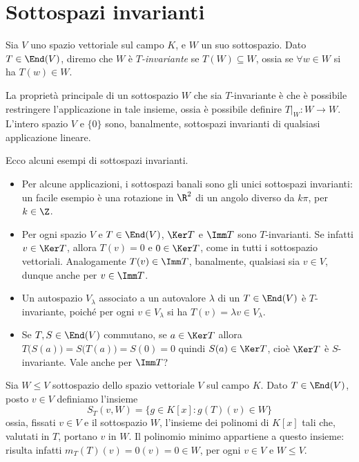 \section{Sottospazi invarianti} \label{sec:sottospazi-invarianti}
\begin{definizione}\label{d:sottospazio-invariante}
	Sia $V$ uno spazio vettoriale sul campo $K$, e $W$ un suo sottospazio.
	Dato $T\in\End(V)$, diremo che $W$ è \emph{$T$-invariante} se $T(W)\subseteq W$, ossia se $\forall w\in W$ si ha $T(w)\in W$.
\end{definizione}
La proprietà principale di un sottospazio $W$ che sia $T$-invariante è che è possibile restringere l'applicazione in tale insieme, ossia è possibile definire $T|_W\colon W\to W$.
L'intero spazio $V$ e $\{0\}$ sono, banalmente, sottospazi invarianti di qualsiasi applicazione lineare.

Ecco alcuni esempi di sottospazi invarianti.
\begin{itemize}
	\item Per alcune applicazioni, i sottospazi banali sono gli unici sottospazi invarianti: un facile esempio è una rotazione in $\R^2$ di un angolo diverso da $k\pi$, per $k\in\Z$.
	\item Per ogni spazio $V$ e $T\in\End(V)$, $\Ker T$ e $\Imm T$ sono $T$-invarianti.
		Se infatti $v\in\Ker T$, allora $T(v)=0$ e $0\in\Ker T$, come in tutti i sottospazio vettoriali.
		Analogamente $T(v)\in\Imm T$, banalmente, qualsiasi sia $v\in V$, dunque anche per $v\in\Imm T$.
	\item Un autospazio $V_\lambda$ associato a un autovalore $\lambda$ di un $T\in\End(V)$ è $T$-invariante, poich\'e per ogni $v\in V_\lambda$ si ha $T(v)=\lambda v\in V_\lambda$.
	\item Se $T,S\in\End(V)$ commutano, se $a\in\Ker T$ allora $T\big(S(a)\big)=S\big(T(a)\big)=S(0)=0$ quindi $S(a)\in\Ker T$, cioè $\Ker T$ è $S$-invariante.
		Vale anche per $\Imm T$?
\end{itemize}

Sia $W \leq V$ sottospazio dello spazio vettoriale $V$ sul campo $K$.
Dato $T\in\End(V)$, posto $v\in V$ definiamo l'insieme
\begin{equation*}
	S_T(v, W)= \{ g\in K[x]\colon g(T)(v)\in W\}
\end{equation*}
ossia, fissati $v\in V$ e il sottospazio $W$, l'insieme dei polinomi di $K[x]$ tali che, valutati in $T$, portano $v$ in $W$.
Il polinomio minimo appartiene a questo insieme: risulta infatti $m_T(T)(v)=0(v)=0\in W$, per ogni $v\in V$ e $W\le V$.

